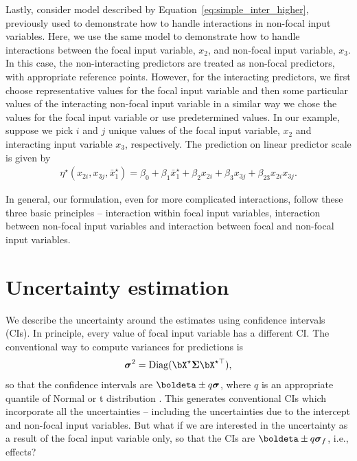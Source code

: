 %
Lastly, consider model described by Equation~\ref{eq:simple_inter_higher}, previously used to demonstrate how to handle interactions in non-focal input variables. Here, we use the same model to demonstrate how to handle interactions between the focal input variable, $x_2$, and non-focal input variable, $x_3$. In this case, the non-interacting predictors are treated as non-focal predictors, with appropriate reference points. However, for the interacting predictors, we first choose representative values for the focal input variable and then some particular values of the interacting non-focal input variable in a similar way we chose the values for the focal input variable or use predetermined values. In our example, suppose we pick $i$ and $j$ unique values of the focal input variable, $x_2$ and interacting input variable $x_3$, respectively. The prediction on linear predictor scale is given by
%
\begin{align*}
\eta^\star(x_{2i}, x_{3j}, {\bar{x}^\star_1}) = \beta_0 + \beta_1 \bar{x}^\star_1 + \beta_2x_{2i} + \beta_3x_{3j} + \beta_{23}x_{2i}x_{3j}.
\end{align*}
%

In general, our formulation, even for more complicated interactions, follow these three basic principles -- interaction within focal input variables, interaction between non-focal input variables and interaction between focal and non-focal input variables.

\section{Uncertainty estimation}

We describe the uncertainty around the estimates using confidence intervals (CIs). In principle, every value of focal input variable has a different CI. The conventional way to compute variances for predictions is 
%
\begin{align}\label{eq:conventional_variance}
\boldsymbol\sigma^2 = \textrm{Diag}(\bX^\star \boldsymbol{\Sigma} \bX^{\star\top}), 
\end{align}
so that the confidence intervals are $\boldeta \pm q\boldsymbol\sigma$, where $q$ is an appropriate quantile of Normal or t distribution \citep{lenth2018package, fox2009effect}. This generates conventional CIs which incorporate all the uncertainties -- including the uncertainties due to the intercept and non-focal input variables.  But what if we are interested in the uncertainty as a result of the focal input variable only, so that the CIs are $\boldeta \pm q \boldsymbol \sigma_f$, i.e., effects? 

